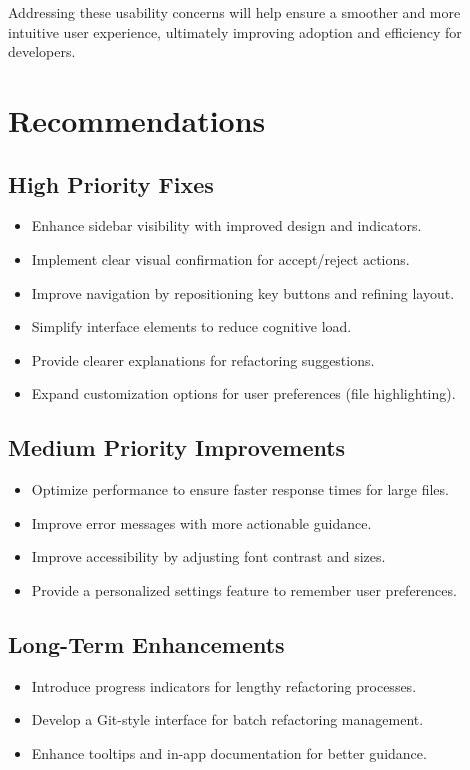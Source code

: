 \documentclass{article}
\begin{document}
Addressing these usability concerns will help ensure a smoother and more intuitive user experience, ultimately improving adoption and efficiency for developers.

\newpage
\section{Recommendations}

\subsection{High Priority Fixes}
\begin{itemize}
\item Enhance sidebar visibility with improved design and indicators.
\item Implement clear visual confirmation for accept/reject actions.
\item Improve navigation by repositioning key buttons and refining layout.
\item Simplify interface elements to reduce cognitive load.
\item Provide clearer explanations for refactoring suggestions.
\item Expand customization options for user preferences (file highlighting).
\end{itemize}

\subsection{Medium Priority Improvements}
\begin{itemize}
\item Optimize performance to ensure faster response times for large files.
\item Improve error messages with more actionable guidance.
\item Improve accessibility by adjusting font contrast and sizes.
\item Provide a personalized settings feature to remember user preferences.
\end{itemize}

\subsection{Long-Term Enhancements}
\begin{itemize}
\item Introduce progress indicators for lengthy refactoring processes.
\item Develop a Git-style interface for batch refactoring management.
\item Enhance tooltips and in-app documentation for better guidance.
\end{itemize}
\end{document}
